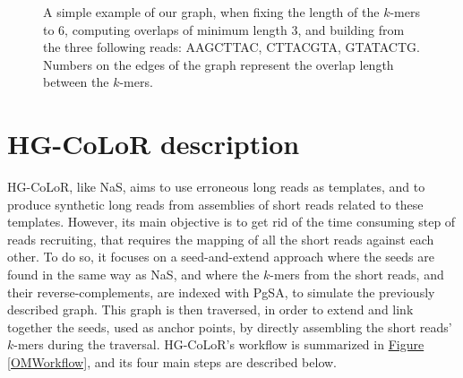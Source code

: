\documentclass[long, final]{jobim2017}
\begin{document}
\begin{figure}
	\begin{center}
	\end{center}
	\caption{A simple example of our graph, when fixing the length of the $k$-mers to 6, computing overlaps of minimum length 3, and building
	from the three following reads: AAGCTTAC, CTTACGTA, GTATACTG. Numbers on the edges of the graph represent the overlap length 
	between the $k$-mers.
	\label{HGraph}}
\end{figure}

\section{HG-CoLoR description}
\label{sec:OMO}

HG-CoLoR, like NaS, aims to use erroneous long reads as templates, and to produce synthetic long reads from assemblies of short reads related to these templates. However, its main objective is to get rid of the time consuming step of reads recruiting, that requires the mapping of all the short reads against each other. To do so, it focuses on a seed-and-extend approach where the seeds are found in the same way as NaS, and where the $k$-mers from the short reads, and their reverse-complements, are indexed with PgSA, to simulate the previously described graph. This graph is then traversed, in order to extend and link together the seeds, used as anchor points, by directly assembling the short reads' $k$-mers during the traversal. HG-CoLoR's workflow is summarized in \hyperref[OMWorkflow]{Figure \ref*{OMWorkflow}}, and its four main steps are described below.
\end{document}
